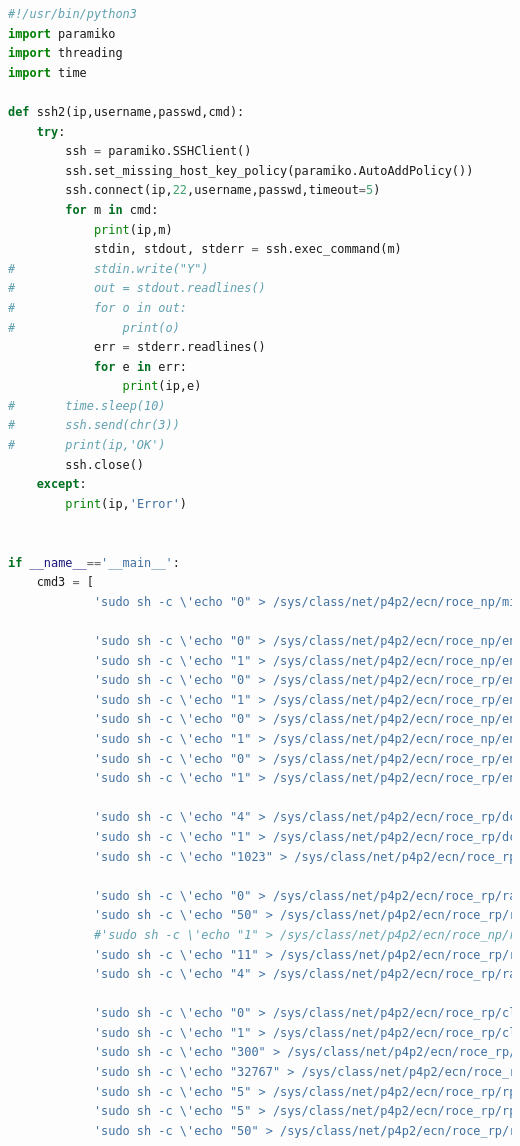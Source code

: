 \documentclass[12pt,a4paper]{article}
\begin{document}
\begin{lstlisting}[language=Python]
#!/usr/bin/python3
import paramiko
import threading
import time

def ssh2(ip,username,passwd,cmd):
    try:
        ssh = paramiko.SSHClient()
        ssh.set_missing_host_key_policy(paramiko.AutoAddPolicy())
        ssh.connect(ip,22,username,passwd,timeout=5)
        for m in cmd:
            print(ip,m)
            stdin, stdout, stderr = ssh.exec_command(m)
#			stdin.write("Y")
#			out = stdout.readlines()
#			for o in out:
#				print(o)
            err = stderr.readlines()
            for e in err:
                print(ip,e)
#		time.sleep(10)
#		ssh.send(chr(3))
#		print(ip,'OK')
        ssh.close()
    except:
        print(ip,'Error')


if __name__=='__main__':
    cmd3 = [
            'sudo sh -c \'echo "0" > /sys/class/net/p4p2/ecn/roce_np/min_time_between_cnps\'',

            'sudo sh -c \'echo "0" > /sys/class/net/p4p2/ecn/roce_np/enable/3\'',
            'sudo sh -c \'echo "1" > /sys/class/net/p4p2/ecn/roce_np/enable/3\'',
            'sudo sh -c \'echo "0" > /sys/class/net/p4p2/ecn/roce_rp/enable/3\'',
            'sudo sh -c \'echo "1" > /sys/class/net/p4p2/ecn/roce_rp/enable/3\'',
            'sudo sh -c \'echo "0" > /sys/class/net/p4p2/ecn/roce_np/enable/4\'',
            'sudo sh -c \'echo "1" > /sys/class/net/p4p2/ecn/roce_np/enable/4\'',
            'sudo sh -c \'echo "0" > /sys/class/net/p4p2/ecn/roce_rp/enable/4\'',
            'sudo sh -c \'echo "1" > /sys/class/net/p4p2/ecn/roce_rp/enable/4\'',

            'sudo sh -c \'echo "4" > /sys/class/net/p4p2/ecn/roce_rp/dce_tcp_g\'',
            'sudo sh -c \'echo "1" > /sys/class/net/p4p2/ecn/roce_rp/dce_tcp_rtt\'',
            'sudo sh -c \'echo "1023" > /sys/class/net/p4p2/ecn/roce_rp/initial_alpha_value\'',

            'sudo sh -c \'echo "0" > /sys/class/net/p4p2/ecn/roce_rp/rate_to_set_on_first_cnp\'',
            'sudo sh -c \'echo "50" > /sys/class/net/p4p2/ecn/roce_rp/rpg_min_dec_fac\'',
            #'sudo sh -c \'echo "1" > /sys/class/net/p4p2/ecn/roce_np/rpg_min_rate\'',
            'sudo sh -c \'echo "11" > /sys/class/net/p4p2/ecn/roce_rp/rpg_gd\'',
            'sudo sh -c \'echo "4" > /sys/class/net/p4p2/ecn/roce_rp/rate_reduce_monitor_period\'',

            'sudo sh -c \'echo "0" > /sys/class/net/p4p2/ecn/roce_rp/clamp_tgt_rate\'',
            'sudo sh -c \'echo "1" > /sys/class/net/p4p2/ecn/roce_rp/clamp_tgt_rate_after_time_inc\'',
            'sudo sh -c \'echo "300" > /sys/class/net/p4p2/ecn/roce_rp/rpg_time_reset\'',
            'sudo sh -c \'echo "32767" > /sys/class/net/p4p2/ecn/roce_rp/rpg_byte_reset\'',
            'sudo sh -c \'echo "5" > /sys/class/net/p4p2/ecn/roce_rp/rpg_threshold\'',
            'sudo sh -c \'echo "5" > /sys/class/net/p4p2/ecn/roce_rp/rpg_ai_rate\'',
            'sudo sh -c \'echo "50" > /sys/class/net/p4p2/ecn/roce_rp/rpg_hai_rate\'',


\end{lstlisting}
\end{document}
